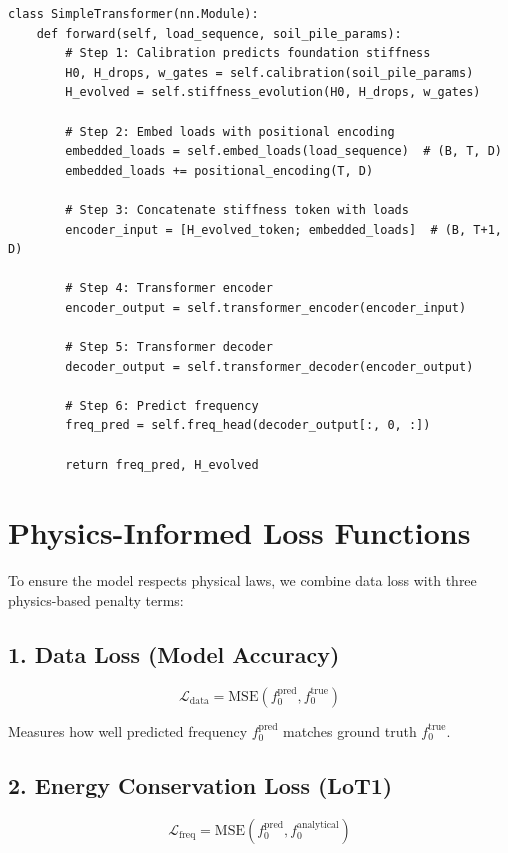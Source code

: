 \documentclass[11pt,a4paper]{article}
\begin{document}
\begin{lstlisting}
class SimpleTransformer(nn.Module):
    def forward(self, load_sequence, soil_pile_params):
        # Step 1: Calibration predicts foundation stiffness
        H0, H_drops, w_gates = self.calibration(soil_pile_params)
        H_evolved = self.stiffness_evolution(H0, H_drops, w_gates)

        # Step 2: Embed loads with positional encoding
        embedded_loads = self.embed_loads(load_sequence)  # (B, T, D)
        embedded_loads += positional_encoding(T, D)

        # Step 3: Concatenate stiffness token with loads
        encoder_input = [H_evolved_token; embedded_loads]  # (B, T+1, D)

        # Step 4: Transformer encoder
        encoder_output = self.transformer_encoder(encoder_input)

        # Step 5: Transformer decoder
        decoder_output = self.transformer_decoder(encoder_output)

        # Step 6: Predict frequency
        freq_pred = self.freq_head(decoder_output[:, 0, :])

        return freq_pred, H_evolved
\end{lstlisting}

\section{Physics-Informed Loss Functions}

To ensure the model respects physical laws, we combine data loss with three physics-based penalty terms:

\subsection{1. Data Loss (Model Accuracy)}

\begin{equation}
\mathcal{L}_{\text{data}} = \text{MSE}(f_0^{\text{pred}}, f_0^{\text{true}})
\end{equation}

Measures how well predicted frequency $f_0^{\text{pred}}$ matches ground truth $f_0^{\text{true}}$.

\subsection{2. Energy Conservation Loss (LoT1)}

\begin{equation}
\mathcal{L}_{\text{freq}} = \text{MSE}(f_0^{\text{pred}}, f_0^{\text{analytical}})
\end{equation}
\end{document}
